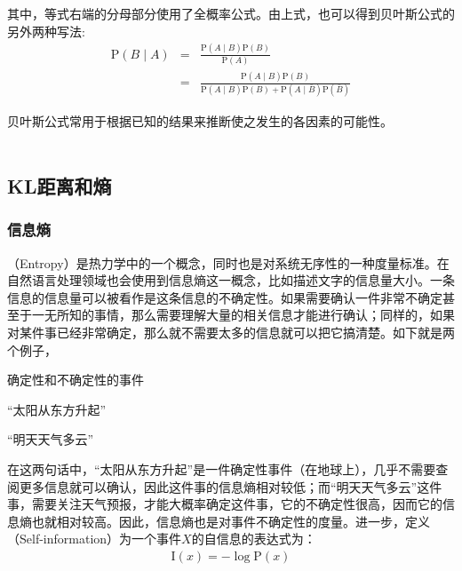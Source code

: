 \noindent 其中，等式右端的分母部分使用了全概率公式。由上式，也可以得到贝叶斯公式的另外两种写法:
\begin{eqnarray}
\textrm{P}(B \mid A) & = & \frac { \textrm{P}(A \mid B)\textrm{P}(B) }  {\textrm{P}(A)} \nonumber \\
                     & = & \frac { \textrm{P}(A \mid B)\textrm{P}(B) }  {\textrm{P}(A \mid B)\textrm{P}(B)+\textrm{P}(A \mid \bar{B}) \textrm{P}(\bar{B})}
\label{eq:2-12}
\end{eqnarray}

\parinterval 贝叶斯公式常用于根据已知的结果来推断使之发生的各因素的可能性。 \\ \\ 


\subsection{KL距离和熵}


\subsubsection{信息熵}

（Entropy）是热力学中的一个概念，同时也是对系统无序性的一种度量标准。在自然语言处理领域也会使用到信息熵这一概念，比如描述文字的信息量大小。一条信息的信息量可以被看作是这条信息的不确定性。如果需要确认一件非常不确定甚至于一无所知的事情，那么需要理解大量的相关信息才能进行确认；同样的，如果对某件事已经非常确定，那么就不需要太多的信息就可以把它搞清楚。如下就是两个例子，

\begin{example}
确定性和不确定性的事件

\qquad\qquad\quad``太阳从东方升起''

\qquad\qquad\quad``明天天气多云''
\label{eg:2-1}
\end{example}

\parinterval 在这两句话中，``太阳从东方升起''是一件确定性事件（在地球上），几乎不需要查阅更多信息就可以确认，因此这件事的信息熵相对较低；而``明天天气多云''这件事，需要关注天气预报，才能大概率确定这件事，它的不确定性很高，因而它的信息熵也就相对较高。因此，信息熵也是对事件不确定性的度量。进一步，定义{\small{}}（Self-information）为一个事件$X$的自信息的表达式为：
\begin{eqnarray}
\textrm{I}(x)=-\log\textrm{P}(x)
\label{eq:2-13}
\end{eqnarray}

